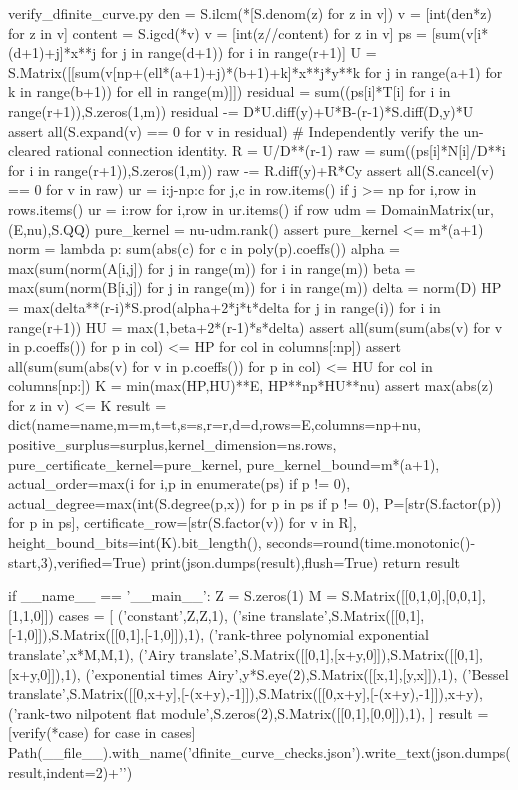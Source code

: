 \begin{filecontents*}[overwrite]{verify_dfinite_curve.py}
    den = S.ilcm(*[S.denom(z) for z in v])
    v = [int(den*z) for z in v]
    content = S.igcd(*v)
    v = [int(z//content) for z in v]
    ps = [sum(v[i*(d+1)+j]*x**j for j in range(d+1)) for i in range(r+1)]
    U = S.Matrix([[sum(v[np+(ell*(a+1)+j)*(b+1)+k]*x**j*y**k
                       for j in range(a+1) for k in range(b+1))
                    for ell in range(m)]])
    residual = sum((ps[i]*T[i] for i in range(r+1)),S.zeros(1,m))
    residual -= D*U.diff(y)+U*B-(r-1)*S.diff(D,y)*U
    assert all(S.expand(v) == 0 for v in residual)
    # Independently verify the un-cleared rational connection identity.
    R = U/D**(r-1)
    raw = sum((ps[i]*N[i]/D**i for i in range(r+1)),S.zeros(1,m))
    raw -= R.diff(y)+R*Cy
    assert all(S.cancel(v) == 0 for v in raw)
    ur = {i:{j-np:c for j,c in row.items() if j >= np} for i,row in rows.items()}
    ur = {i:row for i,row in ur.items() if row}
    udm = DomainMatrix(ur,(E,nu),S.QQ)
    pure_kernel = nu-udm.rank()
    assert pure_kernel <= m*(a+1)
    norm = lambda p: sum(abs(c) for c in poly(p).coeffs())
    alpha = max(sum(norm(A[i,j]) for j in range(m)) for i in range(m))
    beta = max(sum(norm(B[i,j]) for j in range(m)) for i in range(m))
    delta = norm(D)
    HP = max(delta**(r-i)*S.prod(alpha+2*j*t*delta for j in range(i))
             for i in range(r+1))
    HU = max(1,beta+2*(r-1)*s*delta)
    assert all(sum(sum(abs(v) for v in p.coeffs()) for p in col) <= HP
               for col in columns[:np])
    assert all(sum(sum(abs(v) for v in p.coeffs()) for p in col) <= HU
               for col in columns[np:])
    K = min(max(HP,HU)**E, HP**np*HU**nu)
    assert max(abs(z) for z in v) <= K
    result = dict(name=name,m=m,t=t,s=s,r=r,d=d,rows=E,columns=np+nu,
                  positive_surplus=surplus,kernel_dimension=ns.rows,
                  pure_certificate_kernel=pure_kernel,
                  pure_kernel_bound=m*(a+1),
                  actual_order=max(i for i,p in enumerate(ps) if p != 0),
                  actual_degree=max(int(S.degree(p,x)) for p in ps if p != 0),
                  P=[str(S.factor(p)) for p in ps],
                  certificate_row=[str(S.factor(v)) for v in R],
                  height_bound_bits=int(K).bit_length(),
                  seconds=round(time.monotonic()-start,3),verified=True)
    print(json.dumps(result),flush=True)
    return result

if __name__ == '__main__':
    Z = S.zeros(1)
    M = S.Matrix([[0,1,0],[0,0,1],[1,1,0]])
    cases = [
        ('constant',Z,Z,1),
        ('sine translate',S.Matrix([[0,1],[-1,0]]),S.Matrix([[0,1],[-1,0]]),1),
        ('rank-three polynomial exponential translate',x*M,M,1),
        ('Airy translate',S.Matrix([[0,1],[x+y,0]]),S.Matrix([[0,1],[x+y,0]]),1),
        ('exponential times Airy',y*S.eye(2),S.Matrix([[x,1],[y,x]]),1),
        ('Bessel translate',S.Matrix([[0,x+y],[-(x+y),-1]]),S.Matrix([[0,x+y],[-(x+y),-1]]),x+y),
        ('rank-two nilpotent flat module',S.zeros(2),S.Matrix([[0,1],[0,0]]),1),
    ]
    result = [verify(*case) for case in cases]
    Path(__file__).with_name('dfinite_curve_checks.json').write_text(json.dumps(result,indent=2)+'\n')
\end{filecontents*}
